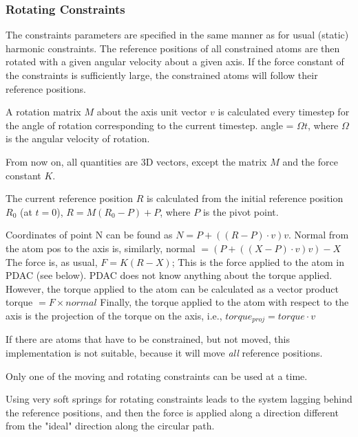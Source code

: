 \subsubsection{Rotating Constraints}

The constraints parameters are specified in the same manner as for
usual (static) harmonic constraints. The reference positions of all
constrained atoms are then rotated with a given angular velocity
about a given axis. If the force constant of the constraints is
sufficiently
large, the constrained atoms will follow their reference positions.

A rotation matrix $M$ about the axis unit vector $v$ is calculated every
timestep
for the angle of rotation corresponding to the current timestep.
    angle = $\Omega t$,
where $\Omega$ is the angular velocity of rotation.

From now on, all quantities are 3D vectors, except the matrix $M$ and the
force constant $K$.

The current reference position $R$ is calculated from the initial
reference
position $R_0$ (at $t=0$),
    $R = M (R_0 - P) + P$,
where $P$ is the pivot point.

%
%
%

Coordinates of point N can be found as
   $N = P + ( (R - P) \cdot v ) v$.
Normal from the atom pos to the axis is, similarly,
   normal $= ( P + ( (X - P) \cdot v ) v ) - X$
The force is, as usual,
   $F = K (R - X)$;
This is the force applied to the atom in PDAC (see below).
PDAC does not know anything about the torque
applied. However, the torque applied to the atom can be calculated
as a vector product
   torque $= F \times normal$
Finally, the torque applied to the atom with respect to the axis
is the projection of the torque on the axis, i.e.,
   $torque_{proj} = torque \cdot v$

If there are atoms that have to be constrained, but not moved,
this implementation is not suitable, because it will move {\em all}
reference positions.

Only one of the moving and rotating constraints can be used at a
time.

Using very soft springs for rotating constraints leads to the system
   lagging behind the reference positions, and then the force is applied
   along a direction different from the "ideal" direction along the
   circular path.

